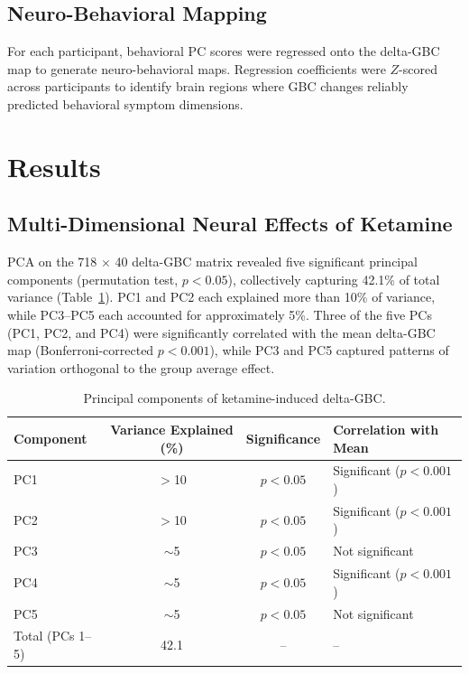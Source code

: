 \documentclass[12pt]{article}
\begin{document}
\subsection{Neuro-Behavioral Mapping}

For each participant, behavioral PC scores were regressed onto the delta-GBC map to generate neuro-behavioral maps. Regression coefficients were $Z$-scored across participants to identify brain regions where GBC changes reliably predicted behavioral symptom dimensions.

\section{Results}

\subsection{Multi-Dimensional Neural Effects of Ketamine}

PCA on the 718 $\times$ 40 delta-GBC matrix revealed five significant principal components (permutation test, $p < 0.05$), collectively capturing 42.1\% of total variance (Table~\ref{tab:pca_results}). PC1 and PC2 each explained more than 10\% of variance, while PC3--PC5 each accounted for approximately 5\%. Three of the five PCs (PC1, PC2, and PC4) were significantly correlated with the mean delta-GBC map (Bonferroni-corrected $p < 0.001$), while PC3 and PC5 captured patterns of variation orthogonal to the group average effect.

\begin{table}[ht]
\centering
\caption{Principal components of ketamine-induced delta-GBC.}
\label{tab:pca_results}
\begin{tabular}{lccl}
\toprule
Component & Variance Explained (\%) & Significance & Correlation with Mean \\
\midrule
PC1 & $>$10 & $p < 0.05$ & Significant ($p < 0.001$) \\
PC2 & $>$10 & $p < 0.05$ & Significant ($p < 0.001$) \\
PC3 & $\sim$5 & $p < 0.05$ & Not significant \\
PC4 & $\sim$5 & $p < 0.05$ & Significant ($p < 0.001$) \\
PC5 & $\sim$5 & $p < 0.05$ & Not significant \\
\midrule
Total (PCs 1--5) & 42.1 & -- & -- \\
\bottomrule
\end{tabular}
\end{table}
\end{document}
